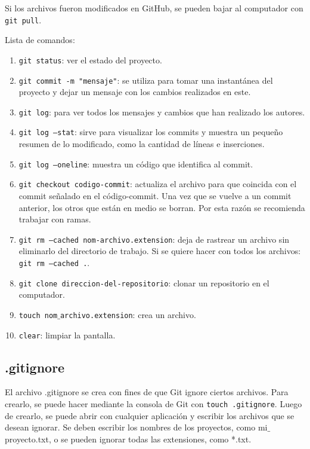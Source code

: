 \documentclass[a4paper, 12pt]{book}
\begin{document}
Si los archivos fueron modificados en GitHub, se pueden bajar al computador con \texttt{git pull}.

Lista de comandos: 
\begin{enumerate}
\item \texttt{git status}: ver el estado del proyecto.
\item \texttt{git commit -m "mensaje"}: se utiliza para tomar una instantánea del proyecto y dejar un mensaje con los cambios realizados en este.
\item \texttt{git log}: para ver todos los mensajes y cambios que han realizado los autores.
\item \texttt{git log --stat}: sirve para visualizar los commits y muestra un pequeño resumen de lo modificado, como la cantidad de líneas e inserciones.
\item \texttt{git log --oneline}: muestra un código que identifica al commit.
\item \texttt{git checkout codigo-commit}: actualiza el archivo para que coincida con el commit señalado en el código-commit. Una vez que se vuelve a un commit anterior, los otros que están en medio se borran. Por esta razón se recomienda trabajar con ramas.
\item \texttt{git rm --cached nom-archivo.extension}: deja de rastrear un archivo sin eliminarlo del directorio de trabajo. Si se quiere hacer con todos los archivos: \texttt{git rm --cached .}.
\item \texttt{git clone direccion-del-repositorio}: clonar un repositorio en el computador.
\item \texttt{touch nom$\_$archivo.extension}: crea un archivo.
\item \texttt{clear}: limpiar la pantalla.
\end{enumerate}
\subsection{.gitignore}
El archivo .gitignore se crea con fines de que Git ignore ciertos archivos. Para crearlo, se puede hacer mediante la consola de Git con \texttt{touch .gitignore}. Luego de crearlo, se puede abrir con cualquier aplicación y escribir los archivos que se desean ignorar. Se deben escribir los nombres de los proyectos, como mi$\_$proyecto.txt, o se pueden ignorar todas las extensiones, como *.txt.

\end{document}
